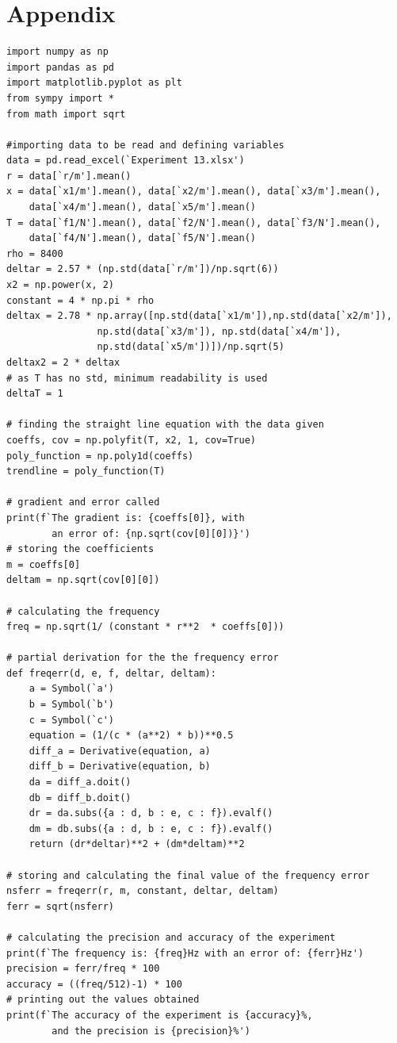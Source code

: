 \documentclass[12pt, a4paper]{article}
\begin{document}
\section*{Appendix}
\begin{verbatim}
import numpy as np
import pandas as pd
import matplotlib.pyplot as plt
from sympy import *
from math import sqrt
 
#importing data to be read and defining variables
data = pd.read_excel(`Experiment 13.xlsx')
r = data[`r/m'].mean()
x = data[`x1/m'].mean(), data[`x2/m'].mean(), data[`x3/m'].mean(),       
    data[`x4/m'].mean(), data[`x5/m'].mean()
T = data[`f1/N'].mean(), data[`f2/N'].mean(), data[`f3/N'].mean(), 
    data[`f4/N'].mean(), data[`f5/N'].mean()
rho = 8400
deltar = 2.57 * (np.std(data[`r/m'])/np.sqrt(6))
x2 = np.power(x, 2)
constant = 4 * np.pi * rho
deltax = 2.78 * np.array([np.std(data[`x1/m']),np.std(data[`x2/m']),
                np.std(data[`x3/m']), np.std(data[`x4/m']),
                np.std(data[`x5/m'])])/np.sqrt(5)
deltax2 = 2 * deltax
# as T has no std, minimum readability is used
deltaT = 1
 
# finding the straight line equation with the data given
coeffs, cov = np.polyfit(T, x2, 1, cov=True)
poly_function = np.poly1d(coeffs)
trendline = poly_function(T)

# gradient and error called
print(f`The gradient is: {coeffs[0]}, with 
        an error of: {np.sqrt(cov[0][0])}')
# storing the coefficients
m = coeffs[0]
deltam = np.sqrt(cov[0][0])
 
# calculating the frequency
freq = np.sqrt(1/ (constant * r**2  * coeffs[0]))
 
# partial derivation for the the frequency error
def freqerr(d, e, f, deltar, deltam):
    a = Symbol(`a')
    b = Symbol(`b')
    c = Symbol(`c')
    equation = (1/(c * (a**2) * b))**0.5
    diff_a = Derivative(equation, a)
    diff_b = Derivative(equation, b)
    da = diff_a.doit()
    db = diff_b.doit()
    dr = da.subs({a : d, b : e, c : f}).evalf()
    dm = db.subs({a : d, b : e, c : f}).evalf()
    return (dr*deltar)**2 + (dm*deltam)**2
 
# storing and calculating the final value of the frequency error
nsferr = freqerr(r, m, constant, deltar, deltam)
ferr = sqrt(nsferr)
 
# calculating the precision and accuracy of the experiment
print(f`The frequency is: {freq}Hz with an error of: {ferr}Hz')
precision = ferr/freq * 100
accuracy = ((freq/512)-1) * 100
# printing out the values obtained
print(f`The accuracy of the experiment is {accuracy}%, 
        and the precision is {precision}%')
 

\end{verbatim}
\end{document}
